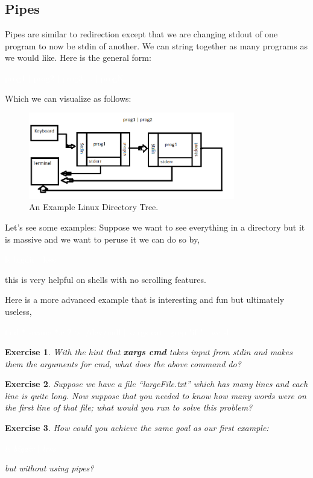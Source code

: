 \documentclass[oneside]{book}
\newcommand{\commandline}[1]{\begin{center} \colorbox{Dark}{\textcolor{white}{#1}} \end{center}}
\newtheorem{ex}{Exercise}[chapter]
\begin{document}
    \subsection{Pipes}
        Pipes are similar to redirection except that we are changing stdout of one program to now be stdin of another. We can string together as many programs as we would like. Here is the general form:
        \commandline{prog1 $|$ prog2 $|$ prog3 ... $|$ progN}
        Which we can visualize as follows:
        \begin{figure}[ht!]
	        \centering
	        \includegraphics[width=90mm]{pipe_example.png}
	        \caption{An Example Linux Directory Tree.} 
        \end{figure}  
        
        Let's see some examples: Suppose we want to see everything in a directory but it is massive and we want to peruse it we can do so by,
        \commandline{ls bigdir $|$ less}
        this is very helpful on shells with no scrolling features. 
        
        Here is a more advanced example that is interesting and fun but ultimately useless,
        \commandline{find * -name *.c $2>$ /dev/null $|$ xargs cat $|$ grep "if " $|$ wc -l}
        
        \begin{ex}
            With the hint that \textbf{xargs cmd} takes input from stdin and makes them the arguments for cmd, what does the above command do?
        \end{ex}
        
        \begin{ex}
            Suppose we have a file ``largeFile.txt'' which has many lines and each line is quite long. Now suppose that you needed to know how many words were on the first line of that file; what would you run to solve this problem?
        \end{ex}
        
        \begin{ex}
            How could you achieve the same goal as our first example:
            \commandline{ls bigdir $|$ less}
            but without using pipes?
        \end{ex}
        
\end{document}
